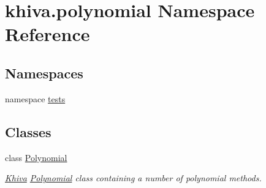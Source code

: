 \hypertarget{namespacekhiva_1_1polynomial}{}\section{khiva.\+polynomial Namespace Reference}
\label{namespacekhiva_1_1polynomial}
\subsection*{Namespaces}
\begin{DoxyCompactItemize}
\item 
namespace \mbox{\hyperlink{namespacekhiva_1_1polynomial_1_1tests}{tests}}
\end{DoxyCompactItemize}
\subsection*{Classes}
\begin{DoxyCompactItemize}
\item 
class \mbox{\hyperlink{classkhiva_1_1polynomial_1_1_polynomial}{Polynomial}}
\begin{DoxyCompactList}\small\item\em \mbox{\hyperlink{classkhiva_1_1_khiva}{Khiva}} \mbox{\hyperlink{classkhiva_1_1polynomial_1_1_polynomial}{Polynomial}} class containing a number of polynomial methods. \end{DoxyCompactList}\end{DoxyCompactItemize}
